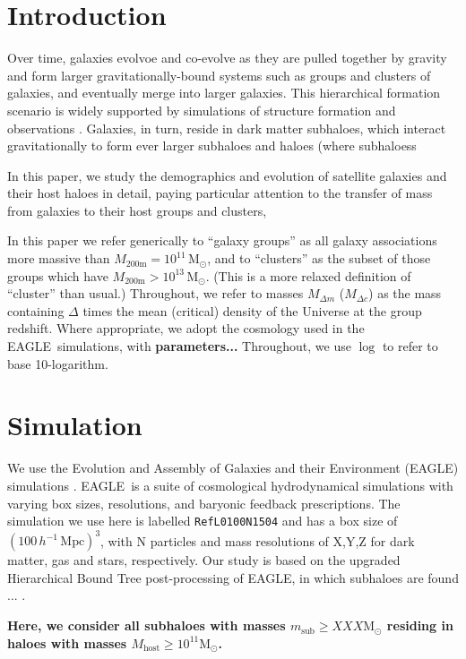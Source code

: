 \documentclass[usenatbib,fleqn]{mnras}
\newcommand{\comment}[1]{\textbf{\color{magenta} #1}}
\newcommand{\eagle}{EAGLE}
\newcommand{\hbt}{\textsc{hbt+}}
\newcommand{\msub}{m_\mathrm{sub}}
\newcommand{\Mhost}{M_\mathrm{host}}
\newcommand{\Msun}{\mathrm{M}_\odot}
\newcommand{\mtwo}{M_\mathrm{200m}}
\newcommand{\hMpc}{h^{-1}\,\mathrm{Mpc}}
\begin{document}
\section{Introduction}

Over time, galaxies evolvoe and co-evolve as they are pulled together by gravity and form larger gravitationally-bound systems such as groups and clusters of galaxies, and eventually merge into larger galaxies. This hierarchical formation scenario is widely supported by simulations of structure formation \citep[e.g.,][]{?} and observations \citep[e.g.,][]{?}. Galaxies, in turn, reside in dark matter subhaloes, which interact gravitationally to form ever larger subhaloes and haloes (where subhaloess

In this paper, we study the demographics and evolution of satellite galaxies and their host haloes in detail, paying particular attention to the transfer of mass from galaxies to their host groups and clusters, 

In this paper we refer generically to ``galaxy groups'' as all galaxy associations more massive than $\mtwo=10^{11}\,\Msun$, and to ``clusters'' as the subset of those groups which have $\mtwo>10^{13}\,\Msun$. (This is a more relaxed definition of ``cluster'' than usual.) Throughout, we refer to masses $M_{\Delta m}$ ($M_{\Delta c}$) as the mass containing $\Delta$ times the mean (critical) density of the Universe at the group redshift. Where appropriate, we adopt the cosmology used in the \eagle\ simulations,  with \textbf{parameters...}
%
Throughout, we use $\log$ to refer to base 10-logarithm.


\section{Simulation}

We use the Evolution and Assembly of Galaxies and their Environment (\eagle) simulations \citep{schaye15,crain15}. \eagle\ is a suite of cosmological hydrodynamical simulations with varying box sizes, resolutions, and baryonic feedback prescriptions. The simulation we use here is labelled \texttt{RefL0100N1504} and has a box size of $(100\,\hMpc)^3$, with N particles and mass resolutions of X,Y,Z for dark matter, gas and stars, respectively. Our study is based on the upgraded Hierarchical Bound Tree \citep[\hbt,][]{han18} post-processing of \eagle, in which subhaloes are found ... . 

\comment{Here, we consider all subhaloes with masses $\msub\geq XXX \Msun$ residing in haloes with masses $\Mhost\geq10^{11}\Msun$.}
\end{document}
